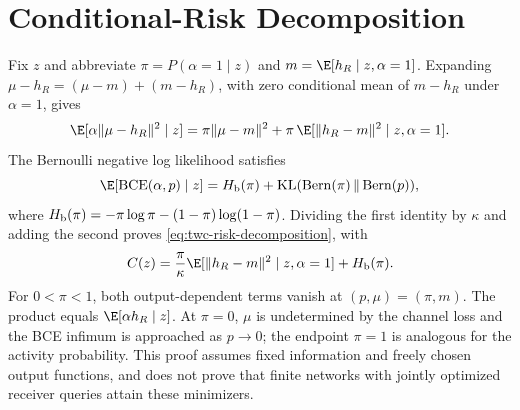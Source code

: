 \section{Conditional-Risk Decomposition}
\label{app:risk}

Fix $z$ and abbreviate $\pi=P(\alpha=1\mid z)$ and
$m=\E[h_R\mid z,\alpha=1]$. Expanding
$\mu-h_R=(\mu-m)+(m-h_R)$, with zero conditional mean of
$m-h_R$ under $\alpha=1$, gives
\begin{equation}
 \E[\alpha\|\mu-h_R\|^2\mid z]
 =\pi\|\mu-m\|^2+
   \pi\,\E[\|h_R-m\|^2\mid z,\alpha=1].
 \label{eq:twc-risk-channel-proof}
\end{equation}
The Bernoulli negative log likelihood satisfies
\begin{equation}
 \E[{\rm BCE}(\alpha,p)\mid z]
 =H_{\rm b}(\pi)+{\rm KL}({\rm Bern}(\pi)\,\|\,{\rm Bern}(p)),
 \label{eq:twc-risk-bce-proof}
\end{equation}
where $H_{\rm b}(\pi)=-\pi\log\pi-(1-\pi)\log(1-\pi)$.
Dividing the first identity by $\kappa$ and adding the second proves
\eqref{eq:twc-risk-decomposition}, with
\begin{equation}
 C(z)=\frac{\pi}{\kappa}\E[\|h_R-m\|^2\mid z,\alpha=1]+H_{\rm b}(\pi).
 \label{eq:twc-risk-constant}
\end{equation}
For $0<\pi<1$, both output-dependent terms vanish at
$(p,\mu)=(\pi,m)$. The product equals $\E[\alpha h_R\mid z]$.
At $\pi=0$, $\mu$ is undetermined by the channel loss and the BCE
infimum is approached as $p\to0$; the endpoint $\pi=1$ is analogous
for the activity probability. This proof assumes fixed information
and freely chosen output functions, and does not prove that finite
networks with jointly optimized receiver queries attain these minimizers.
